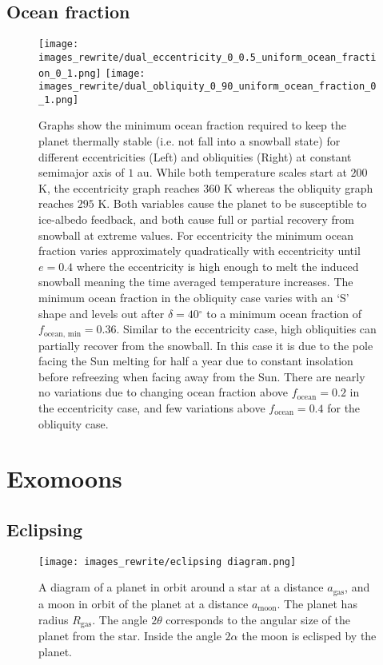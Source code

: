 \documentclass[12pt, onecolumn]{revtex4-2}    %
\newcommand{\degrees}{\ensuremath{^{\circ}}}
\begin{document}
\subsection{Ocean fraction} \label{ssec:qualitative_oceanfraction}
\begin{figure}
  \texttt{[image: images\_rewrite/dual\_eccentricity\_0\_0.5\_uniform\_ocean\_fraction\_0\_1.png]}
  \texttt{[image: images\_rewrite/dual\_obliquity\_0\_90\_uniform\_ocean\_fraction\_0\_1.png]}
  \caption{
    Graphs show the minimum ocean fraction required to keep the planet thermally stable (i.e. not fall into a snowball state) for different eccentricities (Left) and obliquities (Right) at constant semimajor axis of $1$ au.
    While both temperature scales start at $200$ K, the eccentricity graph reaches $360$ K whereas the obliquity graph reaches $295$ K.
    Both variables cause the planet to be susceptible to ice-albedo feedback, and both cause full or partial recovery from snowball at extreme values.
    For eccentricity the minimum ocean fraction varies approximately quadratically with eccentricity until $e = 0.4$ where the eccentricity is high enough to melt the induced snowball meaning the time averaged temperature increases.
    The minimum ocean fraction in the obliquity case varies with an `S' shape and levels out after $\delta = 40\degrees$ to a minimum ocean fraction of $f_\text{ocean, min} = 0.36$.
    Similar to the eccentricity case, high obliquities can partially recover from the snowball. In this case it is due to the pole facing the Sun melting for half a year due to constant insolation before refreezing when facing away from the Sun.
    There are nearly no variations due to changing ocean fraction above $f_\text{ocean} = 0.2$ in the eccentricity case, and few variations above $f_\text{ocean} = 0.4$ for the obliquity case.
  }
  \label{fig:qualitative_oceanfraction}
\end{figure}

\section{Exomoons} \label{sec:Exomoons}
\subsection{Eclipsing} \label{ssec:InvEclipsing}

\begin{figure}
  \texttt{[image: images\_rewrite/eclipsing diagram.png]}
  \caption{
    A diagram of a planet in orbit around a star at a distance $a_{\text{gas}}$, and a moon in orbit of the planet at a distance $a_{\text{moon}}$.
    The planet has radius $R_\text{gas}$.
    The angle $2\theta$ corresponds to the angular size of the planet from the star.
    Inside the angle $2\alpha$ the moon is eclisped by the planet.
  }
  \label{fig:quantitative_eclipsing}
\end{figure}
\end{document}
